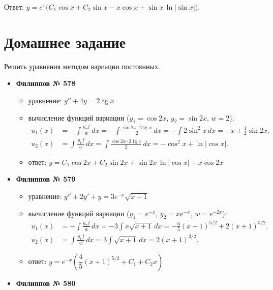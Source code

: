 \documentclass[11pt,a4paper]{article}
\newcommand{\tgn}{\operatorname{tg}}
\begin{document}
Ответ: $y = e^{x}\bigl(C_1\cos x + C_2\sin x - x\cos x + \sin x\,\ln|\sin x|\bigr)$.

\newpage
\section*{Домашнее задание}

Решить уравнения методом вариации постоянных.

\begin{itemize}[topsep=2pt]
  \item \textbf{Филиппов № 578}
  \begin{itemize}
    \item уравнение: $y'' + 4y = 2\tgn x$
    \item вычисление функций вариации ($y_1=\cos 2x$, $y_2=\sin 2x$, $w=2$):
    \[
      \begin{aligned}
        u_1(x) &= -\int\frac{y_2f}{w}\,dx
          = -\int\frac{\sin 2x\cdot 2\tgn x}{2}\,dx
          = -\int 2\sin^2x\,dx = -x+\frac12\sin 2x,\\
        u_2(x) &= \int\frac{y_1f}{w}\,dx
          = \int\frac{\cos 2x\cdot 2\tgn x}{2}\,dx
          = -\cos^2x+\ln|\cos x|.
      \end{aligned}
    \]
    \item ответ: $y = C_1\cos 2x + C_2\sin 2x + \sin 2x\,\ln|\cos x| - x\cos 2x$
  \end{itemize}
  \item \textbf{Филиппов № 579}
  \begin{itemize}
    \item уравнение: $y'' + 2y' + y = 3e^{-x}\sqrt{x + 1}$
    \item вычисление функций вариации ($y_1=e^{-x}$, $y_2=xe^{-x}$, $w=e^{-2x}$):
    \[
      \begin{aligned}
        u_1(x) &= -\int\frac{y_2f}{w}\,dx
          = -3\int x\sqrt{x+1}\,dx
          = -\frac65(x+1)^{5/2}+2(x+1)^{3/2},\\
        u_2(x) &= \int\frac{y_1f}{w}\,dx
          = 3\int\sqrt{x+1}\,dx
          = 2(x+1)^{3/2}.
      \end{aligned}
    \]
    \item ответ: $y = e^{-x}\left(\dfrac45 (x + 1)^{5/2} + C_1 + C_2 x\right)$
  \end{itemize}
  \item \textbf{Филиппов № 580}
  \begin{itemize}

\end{itemize}
\end{itemize}
\end{document}
